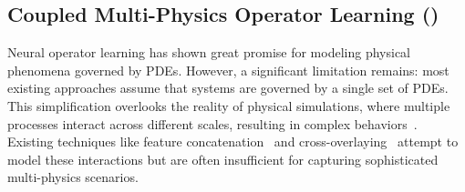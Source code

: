 %

\subsection{Coupled Multi-Physics Operator Learning (\ours)}
Neural operator learning has shown great promise for modeling physical phenomena governed by PDEs. However, a significant limitation remains: most existing approaches assume that systems are governed by a single set of PDEs. This simplification overlooks the reality of physical simulations, where multiple processes interact across different scales, resulting in complex behaviors~\citep{keyes2013multiphysics}. Existing techniques like feature concatenation~\citep{wen2022u} and cross-overlaying~\citep{xiao2023coupled} attempt to model these interactions but are often insufficient for capturing sophisticated multi-physics scenarios.

